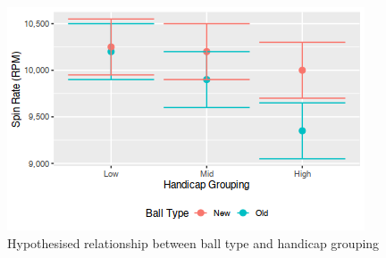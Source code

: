\documentclass{article}
\begin{document}
\begin{figure}[h]
    \centering
    \includegraphics[max width=\linewidth, scale=0.53]{expectations}
    \caption{\label{fig:expectations}Hypothesised relationship between ball type and handicap grouping}
\end{figure}
\end{document}
